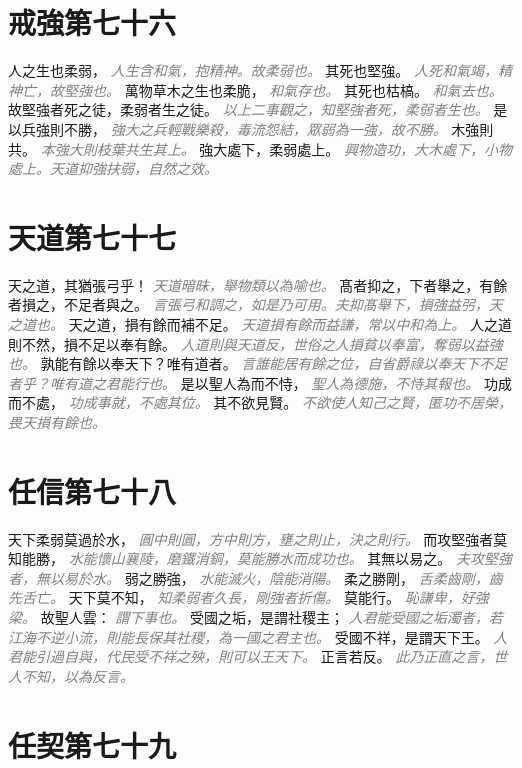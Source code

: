 \documentclass[a4paper,zihao=-4,oneside,landscape,UTF8]{ctexart}
\newcommand{\zhushi}[1]{\scriptsize{\textit{\textcolor{gray}{#1}}}\normalsize}
\begin{document}
\section{戒強第七十六}

人之生也柔弱，
\zhushi{人生含和氣，抱精神。故柔弱也。}
其死也堅強。
\zhushi{人死和氣竭，精神亡，故堅強也。}
萬物草木之生也柔脆，
\zhushi{和氣存也。}
其死也枯槁。
\zhushi{和氣去也。}
故堅強者死之徒，柔弱者生之徒。
\zhushi{以上二事觀之，知堅強者死，柔弱者生也。}
是以兵強則不勝，
\zhushi{強大之兵輕戰樂殺，毒流怨結，眾弱為一強，故不勝。}
木強則共。
\zhushi{本強大則枝葉共生其上。}
強大處下，柔弱處上。
\zhushi{興物造功，大木處下，小物處上。天道抑強扶弱，自然之效。}


\section{天道第七十七}

天之道，其猶張弓乎！
\zhushi{天道暗昧，舉物類以為喻也。}
髙者抑之，下者舉之，有餘者損之，不足者與之。
\zhushi{言張弓和調之，如是乃可用。夫抑髙舉下，損強益弜，天之道也。}
天之道，損有餘而補不足。
\zhushi{天道損有餘而益謙，常以中和為上。}
人之道則不然，損不足以奉有餘。
\zhushi{人道則與天道反，世俗之人損貧以奉富，奪弱以益強也。}
孰能有餘以奉天下？唯有道者。
\zhushi{言誰能居有餘之位，自省爵祿以奉天下不足者乎？唯有道之君能行也。}
是以聖人為而不恃，
\zhushi{聖人為德施，不恃其報也。}
功成而不處，
\zhushi{功成事就，不處其位。}
其不欲見賢。
\zhushi{不欲使人知己之賢，匿功不居榮，畏天損有餘也。}


\section{任信第七十八}

天下柔弱莫過於水，
\zhushi{圓中則圓，方中則方，壅之則止，決之則行。}
而攻堅強者莫知能勝，
\zhushi{水能懷山襄陵，磨鐵消銅，莫能勝水而成功也。}
其無以易之。
\zhushi{夫攻堅強者，無以易於水。}
弱之勝強，
\zhushi{水能滅火，陰能消陽。}
柔之勝剛，
\zhushi{舌柔齒剛，齒先舌亡。}
天下莫不知，
\zhushi{知柔弱者久長，剛強者折傷。}
莫能行。
\zhushi{恥謙卑，好強梁。}
故聖人雲：
\zhushi{謂下事也。}
受國之垢，是謂社稷主；
\zhushi{人君能受國之垢濁者，若江海不逆小流，則能長保其社稷，為一國之君主也。}
受國不祥，是謂天下王。
\zhushi{人君能引過自與，代民受不祥之殃，則可以王天下。}
正言若反。
\zhushi{此乃正直之言，世人不知，以為反言。}


\section{任契第七十九}
\end{document}
